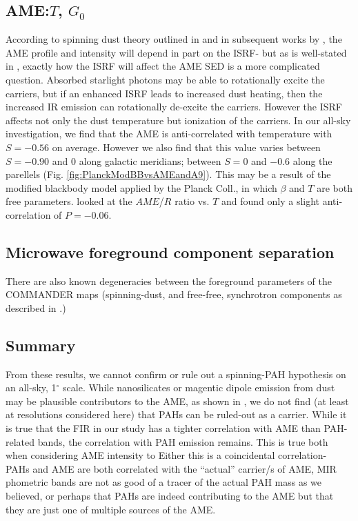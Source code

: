 \documentclass[preprint2,longabstract]{aastex}
\begin{document}
      \subsection{AME:$T$, $G_{0}$}

        According to spinning dust theory outlined in \cite{draine98a} and in subsequent works by \cite{ysard10a}, the AME profile and intensity will depend in part on the ISRF- but as is well-stated in \cite{hensley17a}, exactly how the ISRF will affect the AME SED is a more complicated question. Absorbed starlight photons may be able to rotationally excite the carriers, but if an enhanced ISRF leads to increased dust heating, then the increased IR emission can rotationally de-excite the carriers. However the ISRF affects not only the dust temperature but ionization of the carriers. In our all-sky investigation, we find that the AME is anti-correlated with temperature with $S = -0.56$ on average. However we also find that this value varies between $S = -0.90$ and $0$ along galactic meridians; between $S = 0$ and $-0.6$ along the parellels (Fig. \ref{fig:PlanckModBBvsAMEandA9}). This may be a result of the modified blackbody model applied by the Planck Coll., in which $\beta$ and $T$ are both free parameters.  \cite{hensley16} looked at the $AME$/$R$ ratio vs. $T$ and found only a slight anti-correlation of $P = -0.06$.


      \subsection{Microwave foreground component separation}

        There are also known degeneracies between the foreground parameters of the COMMANDER maps (spinning-dust, and free-free, synchrotron components as described in \cite{planck15X}.)

      \subsection{Summary}

        From these results, we cannot confirm or rule out a spinning-PAH hypothesis on an all-sky, 1$^{\circ}$ scale. While nanosilicates or magentic dipole emission from dust may be plausible contributors to the AME, as shown in \cite{hoang16a, hensley17a}, we do not find (at least at resolutions considered here) that PAHs can be ruled-out as a carrier. While it is true that the FIR in our study has a tighter correlation with AME than PAH-related bands, the correlation with PAH emission remains. This is true both when considering AME intensity to Either this is a coincidental correlation- PAHs and AME are both correlated with the ``actual'' carrier/s of AME, MIR phometric bands are not as good of a tracer of the actual PAH mass as we believed, or perhaps that PAHs are indeed contributing to the AME but that they are just one of multiple sources of the AME.
\end{document}
